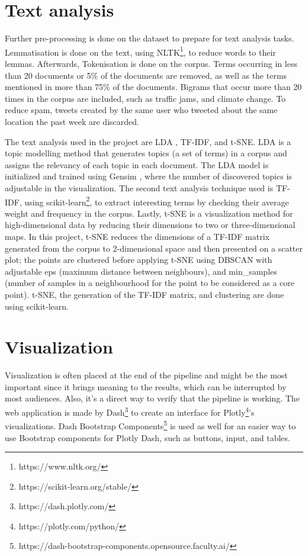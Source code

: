 \section{Text analysis}

Further pre-processing is done on the dataset to prepare for text analysis tasks. Lemmatisation is
done on the text, using \ac{NLTK}\footnote{https://www.nltk.org/}, to reduce words to their lemmas.
Afterwards, Tokenisation is done on the corpus. Terms occurring in less than 20 documents or 5\% of
the documents are removed, as well as the terms mentioned in more than 75\% of the documents.
Bigrams that occur more than 20 times in the corpus are included, such as traffic jams, and climate
change. To reduce spam, tweets created by the same user who tweeted about the same location the past
week are discarded.

The text analysis used in the project are \ac{LDA} \cite{pritchardInferencePopulationStructure2000}
\cite{falushInferencePopulationStructure2003}, \ac{TF-IDF}, and
\ac{t-SNE}\cite{vandermaatenVisualizingHighDimensionalData2008}. \ac{LDA} is a topic modelling
method that generates topics (a set of terms) in a corpus and assigns the relevancy of each topic in
each document. The \ac{LDA} model is initialized and trained using Gensim \cite{rehurek_lrec},
where the number of discovered topics is adjustable in the visualization. The second text analysis
technique used is \ac{TF-IDF}, using scikit-learn\footnote{https://scikit-learn.org/stable/}, to
extract interesting terms by checking their average weight and frequency in the corpus. Lastly,
\ac{t-SNE} is a visualization method for high-dimensional data by reducing their dimensions to two
or three-dimensional maps. In this project, \ac{t-SNE} reduces the dimensions of a \ac{TF-IDF}
matrix generated from the corpus to 2-dimensional space and then presented on a scatter plot; the
points are clustered before applying \ac{t-SNE} using \ac{DBSCAN} with adjustable eps (maximum
distance between neighbours), and min\_samples (number of samples in a neighbourhood for the
point to be considered as a core point). \ac{t-SNE}, the generation of the \ac{TF-IDF} matrix, and
clustering are done using scikit-learn.

\section{Visualization}
 Visualization is often placed at the end of the pipeline and might be the most important since it
brings meaning to the results, which can be interrupted by most audiences. Also, it's a direct way
to verify that the pipeline is working. The web application is made by
Dash\footnote{https://dash.plotly.com/} to create an interface for
Plotly\footnote{https://plotly.com/python/}'s visualizations. Dash Bootstrap
Components\footnote{https://dash-bootstrap-components.opensource.faculty.ai/} is used as well for
an easier way to use Bootstrap components for Plotly Dash, such as buttons, input, and tables.


